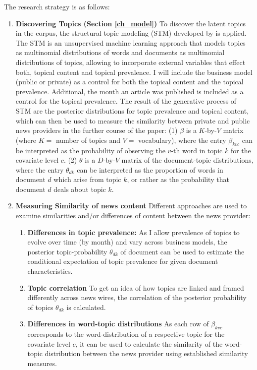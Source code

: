 \documentclass[12pt,a4paper,notitlepage]{article}
\begin{document}
The research strategy is as follows:

\begin{enumerate}
	\item \textbf{Discovering Topics (Section \ref{ch_model})} To discover the latent topics in the corpus, the structural topic modeling (STM) developed by \citet{roberts_model_2016} is applied. The STM is an unsupervised machine learning approach that models topics as multinomial distributions of words and documents as multinomial distributions of topics, allowing to incorporate external variables that effect both, topical content and topical prevalence. I will include the business model (public or private) as a control for both the topical content and the topical prevalence. Additional, the month an article was published is included as a control for the topical prevalence. The result of the generative process of STM are the posterior distributions for topic prevalence and topical content, which can then be used to measure the similarity between private and public news providers in the further course of the paper: (1) $\beta$ is a $K$-by-$V$ matrix (where $K=$ number of topics and $V=$ vocabulary), where the entry $\beta_{kvc}$ can be interpreted as the probability of observing the $v$-th word in topic $k$ for the covariate level $c$. (2) $\theta$ is a $D$-by-$V$ matrix of the document-topic distributions, where the entry $\theta_{dk}$ can be interpreted as the proportion of words in document $d$ which arise from topic $k$, or rather as the probability that document $d$ deals about topic $k$. 
	 
	\item \textbf{Measuring Similarity of news content} Different approaches are used to examine similarities and/or differences of content between the news provider:
	\begin{enumerate}
		\item\label{item_1}\textbf{Differences in topic prevalence:} As I allow prevalence of topics to evolve over time (by month) and vary across business models, the posterior topic-probability $\theta_{dk}$ of document can be used to estimate the conditional expectation of topic prevalence for given document characteristics. 
		
		\item\label{item_2} \textbf{Topic correlation} To get an idea of how topics are linked and framed differently across news wires, the correlation of the posterior probability of topics $\theta_{dk}$ is calculated.

		\item\label{item_3} \textbf{Differences in word-topic distributions} As each row of $\beta_{kvc}$ corresponds to the word-distribution of a respective topic for the covariate level $c$, it can be used to calculate the similarity of the word-topic distribution between the news provider using established similarity measures. 
		
		\end{enumerate}
	
\end{enumerate}
\end{document}
